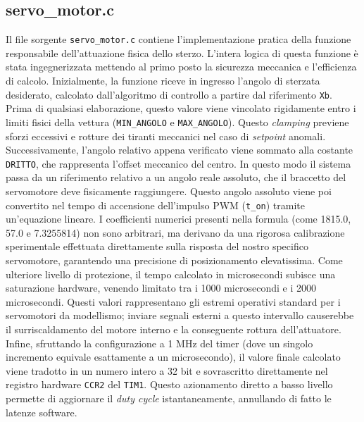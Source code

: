 \documentclass[11pt]{report}
\begin{document}
\subsection{servo\_motor.c}
Il file sorgente \verb|servo_motor.c| contiene l'implementazione pratica della funzione responsabile dell'attuazione fisica dello sterzo. L'intera logica di questa funzione è stata ingegnerizzata mettendo al primo posto la sicurezza meccanica e l'efficienza di calcolo.
Inizialmente, la funzione riceve in ingresso l'angolo di sterzata desiderato, calcolato dall'algoritmo di controllo a partire dal riferimento \verb|Xb|. Prima di qualsiasi elaborazione, questo valore viene vincolato rigidamente entro i limiti fisici della vettura (\verb|MIN_ANGOLO| e \verb|MAX_ANGOLO|). Questo \textit{clamping} previene sforzi eccessivi e rotture dei tiranti meccanici nel caso di \textit{setpoint} anomali.
Successivamente, l'angolo relativo appena verificato viene sommato alla costante \verb|DRITTO|, che rappresenta l'offset meccanico del centro. In questo modo il sistema passa da un riferimento relativo a un angolo reale assoluto, che il braccetto del servomotore deve fisicamente raggiungere. Questo angolo assoluto viene poi convertito nel tempo di accensione dell'impulso PWM (\verb|t_on|) tramite un'equazione lineare. I coefficienti numerici presenti nella formula (come 1815.0, 57.0 e 7.3255814) non sono arbitrari, ma derivano da una rigorosa calibrazione sperimentale effettuata direttamente sulla risposta del nostro specifico servomotore, garantendo una precisione di posizionamento elevatissima.
Come ulteriore livello di protezione, il tempo calcolato in microsecondi subisce una saturazione hardware, venendo limitato tra i 1000 microsecondi e i 2000 microsecondi. Questi valori rappresentano gli estremi operativi standard per i servomotori da modellismo; inviare segnali esterni a questo intervallo causerebbe il surriscaldamento del motore interno e la conseguente rottura dell'attuatore. Infine, sfruttando la configurazione a 1 MHz del timer (dove un singolo incremento equivale esattamente a un microsecondo), il valore finale calcolato viene tradotto in un numero intero a 32 bit e sovrascritto direttamente nel registro hardware \verb|CCR2| del \verb|TIM1|. Questo azionamento diretto a basso livello permette di aggiornare il \textit{duty cycle} istantaneamente, annullando di fatto le latenze software.
\end{document}
